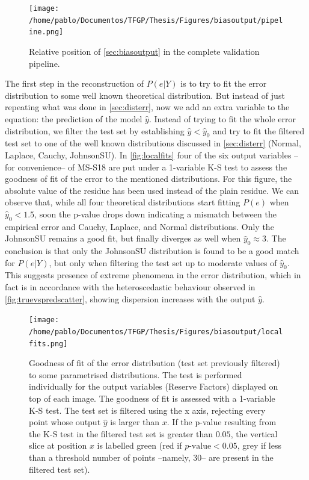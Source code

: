 \begin{figure}[!htb]
	\centering
	\texttt{[image: /home/pablo/Documentos/TFGP/Thesis/Figures/biasoutput/pipeline.png]}
	\caption{Relative position of \autoref{sec:biasoutput} in the complete validation pipeline.}
	\label{fig:boutpipeline}
\end{figure}

%
\indent The first step in the reconstruction of $P(e|Y)$ is to try to fit the error distribution to some well known theoretical distribution. But instead of just repeating what was done in \autoref{sec:disterr}, now we add an extra variable to the equation: the prediction of the model $\hat{y}$. Instead of trying to fit the whole error distribution, we filter the test set by establishing $\hat{y}<\hat{y}_0$ and try to fit the filtered test set to one of the well known distributions discussed in \autoref{sec:disterr} (Normal, Laplace, Cauchy, JohnsonSU). In \autoref{fig:localfits} four of the six output variables --for convenience-- of MS-S18 are put under a 1-variable K-S test to assess the goodness of fit of the error to the mentioned distributions. For this figure, the absolute value of the residue has been used instead of the plain residue. We can observe that, while all four theoretical distributions start fitting $P(e)$ when $\hat{y}_0<1.5$, soon the p-value drops down indicating a mismatch between the empirical error and Cauchy, Laplace, and Normal distributions. Only the JohnsonSU remains a good fit, but finally diverges as well when $\hat{y}_0\approx3$. The conclusion is that only the JohnsonSU distribution is found to be a good match for $P(e|Y)$, but only when filtering the test set up to moderate values of $\hat{y}_0$. This suggests presence of extreme phenomena in the error distribution, which in fact is in accordance with the heteroscedastic behaviour observed in \autoref{fig:truevspredscatter}, showing dispersion increases with the output $\hat{y}$.\\
%
\begin{figure}[!htb]
	\centering
	\texttt{[image: /home/pablo/Documentos/TFGP/Thesis/Figures/biasoutput/localfits.png]}
	\caption{Goodness of fit of the error distribution (test set previously filtered) to some parametrised distributions. The test is performed individually for the output variables (Reserve Factors) displayed on top of each image. The goodness of fit is assessed with a 1-variable K-S test. The test set is filtered using the x axis, rejecting every point whose output $\hat{y}$ is larger than $x$. If the p-value resulting from the K-S test in the filtered test set is greater than $0.05$, the vertical slice at position $x$ is labelled green (red if $p\text{-value}<0.05$, grey if less than a threshold number of points --namely, 30-- are present in the filtered test set).}
	\label{fig:localfits}
\end{figure}
